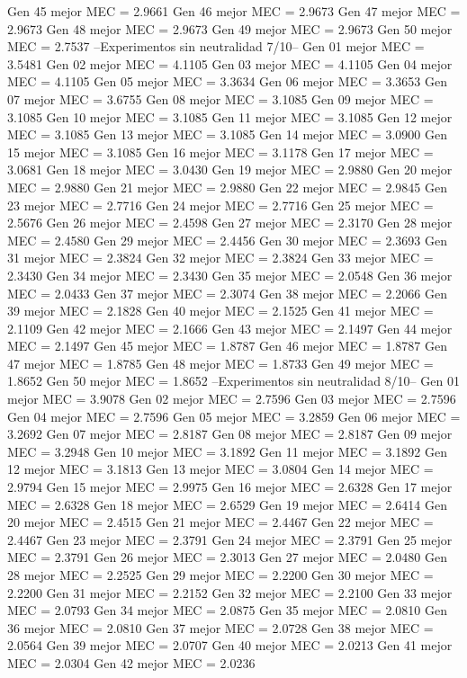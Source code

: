 Gen 45 mejor MEC = 2.9661
Gen 46 mejor MEC = 2.9673
Gen 47 mejor MEC = 2.9673
Gen 48 mejor MEC = 2.9673
Gen 49 mejor MEC = 2.9673
Gen 50 mejor MEC = 2.7537
--Experimentos sin neutralidad 7/10--
Gen 01 mejor MEC = 3.5481
Gen 02 mejor MEC = 4.1105
Gen 03 mejor MEC = 4.1105
Gen 04 mejor MEC = 4.1105
Gen 05 mejor MEC = 3.3634
Gen 06 mejor MEC = 3.3653
Gen 07 mejor MEC = 3.6755
Gen 08 mejor MEC = 3.1085
Gen 09 mejor MEC = 3.1085
Gen 10 mejor MEC = 3.1085
Gen 11 mejor MEC = 3.1085
Gen 12 mejor MEC = 3.1085
Gen 13 mejor MEC = 3.1085
Gen 14 mejor MEC = 3.0900
Gen 15 mejor MEC = 3.1085
Gen 16 mejor MEC = 3.1178
Gen 17 mejor MEC = 3.0681
Gen 18 mejor MEC = 3.0430
Gen 19 mejor MEC = 2.9880
Gen 20 mejor MEC = 2.9880
Gen 21 mejor MEC = 2.9880
Gen 22 mejor MEC = 2.9845
Gen 23 mejor MEC = 2.7716
Gen 24 mejor MEC = 2.7716
Gen 25 mejor MEC = 2.5676
Gen 26 mejor MEC = 2.4598
Gen 27 mejor MEC = 2.3170
Gen 28 mejor MEC = 2.4580
Gen 29 mejor MEC = 2.4456
Gen 30 mejor MEC = 2.3693
Gen 31 mejor MEC = 2.3824
Gen 32 mejor MEC = 2.3824
Gen 33 mejor MEC = 2.3430
Gen 34 mejor MEC = 2.3430
Gen 35 mejor MEC = 2.0548
Gen 36 mejor MEC = 2.0433
Gen 37 mejor MEC = 2.3074
Gen 38 mejor MEC = 2.2066
Gen 39 mejor MEC = 2.1828
Gen 40 mejor MEC = 2.1525
Gen 41 mejor MEC = 2.1109
Gen 42 mejor MEC = 2.1666
Gen 43 mejor MEC = 2.1497
Gen 44 mejor MEC = 2.1497
Gen 45 mejor MEC = 1.8787
Gen 46 mejor MEC = 1.8787
Gen 47 mejor MEC = 1.8785
Gen 48 mejor MEC = 1.8733
Gen 49 mejor MEC = 1.8652
Gen 50 mejor MEC = 1.8652
--Experimentos sin neutralidad 8/10--
Gen 01 mejor MEC = 3.9078
Gen 02 mejor MEC = 2.7596
Gen 03 mejor MEC = 2.7596
Gen 04 mejor MEC = 2.7596
Gen 05 mejor MEC = 3.2859
Gen 06 mejor MEC = 3.2692
Gen 07 mejor MEC = 2.8187
Gen 08 mejor MEC = 2.8187
Gen 09 mejor MEC = 3.2948
Gen 10 mejor MEC = 3.1892
Gen 11 mejor MEC = 3.1892
Gen 12 mejor MEC = 3.1813
Gen 13 mejor MEC = 3.0804
Gen 14 mejor MEC = 2.9794
Gen 15 mejor MEC = 2.9975
Gen 16 mejor MEC = 2.6328
Gen 17 mejor MEC = 2.6328
Gen 18 mejor MEC = 2.6529
Gen 19 mejor MEC = 2.6414
Gen 20 mejor MEC = 2.4515
Gen 21 mejor MEC = 2.4467
Gen 22 mejor MEC = 2.4467
Gen 23 mejor MEC = 2.3791
Gen 24 mejor MEC = 2.3791
Gen 25 mejor MEC = 2.3791
Gen 26 mejor MEC = 2.3013
Gen 27 mejor MEC = 2.0480
Gen 28 mejor MEC = 2.2525
Gen 29 mejor MEC = 2.2200
Gen 30 mejor MEC = 2.2200
Gen 31 mejor MEC = 2.2152
Gen 32 mejor MEC = 2.2100
Gen 33 mejor MEC = 2.0793
Gen 34 mejor MEC = 2.0875
Gen 35 mejor MEC = 2.0810
Gen 36 mejor MEC = 2.0810
Gen 37 mejor MEC = 2.0728
Gen 38 mejor MEC = 2.0564
Gen 39 mejor MEC = 2.0707
Gen 40 mejor MEC = 2.0213
Gen 41 mejor MEC = 2.0304
Gen 42 mejor MEC = 2.0236
